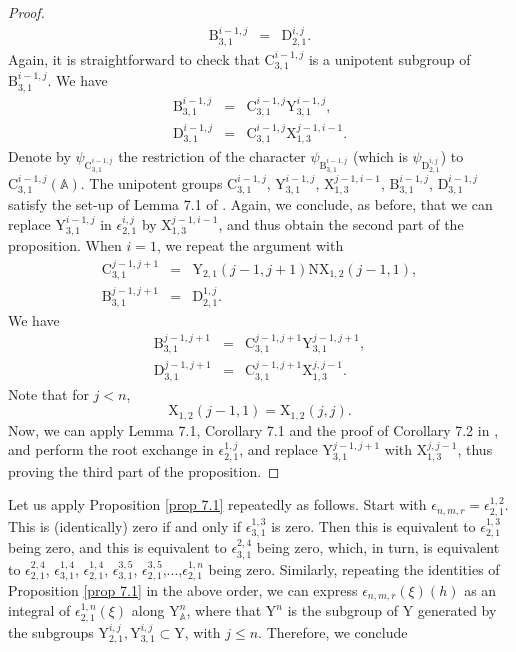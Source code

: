 \documentclass[12pts]{amsart}
\newcommand{\BA}{{\mathbb {A}}}
\begin{document}
\begin{proof}
$$\begin{array}{rcl}
	\mathrm{B}_{3,1}^{i-1,j}&=&\mathrm{D}_{2,1}^{i,j}.
	\end{array}
	$$
	Again, it is straightforward to check that
	$\mathrm{C}_{3,1}^{i-1,j}$ is a unipotent subgroup of
	$\mathrm{B}_{3,1}^{i-1,j}$. We have
	$$
	\begin{array}{rcl}
	\mathrm{B}_{3,1}^{i-1,j}&=&\mathrm{C}_{3,1}^{i-1,j}\mathrm{Y}_{3,1}^{i-1,j},\\
	\mathrm{D}_{3,1}^{i-1,j}&=&\mathrm{C}_{3,1}^{i-1,j}\mathrm{X}_{1,3}^{j-1,i-1}.
	\end{array}
	$$
    Denote by
	$\psi_{\mathrm{C}_{3,1}^{i-1,j}}$ the restriction of the character
	$\psi_{\mathrm{B}_{3,1}^{i-1,j}}$ (which is
	$\psi_{\mathrm{D}_{2,1}^{i,j}}$) to $\mathrm{C}_{3,1}^{i-1,j}(\BA)$. The
	unipotent groups $\mathrm{C}_{3,1}^{i-1,j}$,
	$\mathrm{Y}_{3,1}^{i-1,j}$, $\mathrm{X}_{1,3}^{j-1,i-1}$,
	$\mathrm{B}_{3,1}^{i-1,j}$, $\mathrm{D}_{3,1}^{i-1,j}$ satisfy the
	set-up of Lemma 7.1 of \cite{GRS11}. Again, we conclude, as before,
	that we can replace $\mathrm{Y}_{3,1}^{i-1,j}$ in
	$\epsilon_{2,1}^{i,j}$ by $\mathrm{X}_{1,3}^{j-1,i-1}$, and thus
	obtain the second part of the proposition. When $i=1$, we repeat the
	argument with
	$$
	\begin{array}{rcl}
	\mathrm{C}_{3,1}^{j-1,j+1}&=&\mathrm{Y}_{2,1}(j-1,j+1)\mathrm{N}\mathrm{X}_{1,2}(j-1,1),\\
	\mathrm{B}_{3,1}^{j-1,j+1}&=&\mathrm{D}_{2,1}^{1,j}.
	\end{array}
	$$
	We have
	$$
	\begin{array}{rcl}
	\mathrm{B}_{3,1}^{j-1,j+1}&=&\mathrm{C}_{3,1}^{j-1,j+1}\mathrm{Y}_{3,1}^{j-1,j+1},\\
	\mathrm{D}_{3,1}^{j-1,j+1}&=&\mathrm{C}_{3,1}^{j-1,j+1}\mathrm{X}_{1,3}^{j,j-1}.
	\end{array}
	$$
	Note that for $j<n$,
	$$
	\mathrm{X}_{1,2}(j-1,1)=\mathrm{X}_{1,2}(j,j).
	$$
	Now, we can apply Lemma 7.1, Corollary 7.1 and the proof of
	Corollary 7.2 in \cite{GRS11}, and perform the root exchange in
	$\epsilon_{2,1}^{1,j}$, and replace $\mathrm{Y}_{3,1}^{j-1,j+1}$ with
	$\mathrm{X}_{1,3}^{j,j-1}$, thus proving the third part of the
	proposition. 
\end{proof}

Let us apply Proposition \ref{prop 7.1} repeatedly as follows. Start
with $\epsilon_{n,m,r}=\epsilon_{2,1}^{1,2}$. This is (identically)
zero if and only if $\epsilon_{3,1}^{1,3}$ is zero. Then this is
equivalent to $\epsilon_{2,1}^{1,3}$ being zero, and this is
equivalent to $\epsilon_{3,1}^{2,4}$ being zero, which, in turn, is
equivalent to $\epsilon_{2,1}^{2,4}$, $\epsilon_{3,1}^{1,4}$,
$\epsilon_{2,1}^{1,4}$,
$\epsilon_{3,1}^{3,5}$, $\epsilon_{2,1}^{3,5}$,...,$\epsilon_{2,1}^{1,n}$ being zero. Similarly, repeating the identities of Proposition \ref{prop 7.1} in the above order, we can express $\epsilon_{n,m,r}(\xi)(h)$ as an integral of $\epsilon_{2,1}^{1,n}(\xi)$ along $\mathrm{Y}^n_\BA$, where that $\mathrm{Y}^n$ is the subgroup of $\mathrm{Y}$ generated by the subgroups $\mathrm{Y}_{2,1}^{i,j}, \mathrm{Y}_{3,1}^{i,j}\subset \mathrm{Y}$, with $j\leq n$. 
Therefore, we conclude
\end{document}
